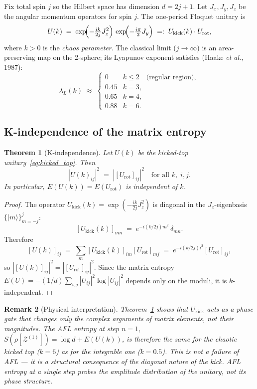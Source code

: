 \documentclass[12pt,a4paper]{article}
\newtheorem{theorem}{Theorem}[section]
\newtheorem{remark}[theorem]{Remark}
\begin{document}
Fix total spin $j$ so the Hilbert space has dimension $d = 2j+1$.
Let $J_x, J_y, J_z$ be the angular momentum operators for spin $j$.
The one-period Floquet unitary is
\begin{equation}\label{eq:kicked_top}
  U(k) \;=\; \exp\!\Bigl(-\tfrac{ik}{2j}J_z^2\Bigr)\,\exp\!\Bigl(-\tfrac{i\pi}{2}J_y\Bigr)
  \;=:\; U_{\mathrm{kick}}(k)\cdot U_{\mathrm{rot}},
\end{equation}
where $k>0$ is the \emph{chaos parameter}.  The classical limit ($j\to\infty$)
is an area-preserving map on the 2-sphere; its Lyapunov exponent satisfies
(Haake \emph{et al.}, 1987):
\begin{equation}\label{eq:lyapunov_table}
  \lambda_L(k) \;\approx\;
  \begin{cases}
    0    & k \leq 2 \quad\text{(regular region)},\\
    0.45 & k = 3,\\
    0.65 & k = 4,\\
    0.88 & k = 6.
  \end{cases}
\end{equation}

\subsection{K-independence of the matrix entropy}

\begin{theorem}[K-independence]\label{thm:k_independence}
Let $U(k)$ be the kicked-top unitary~\eqref{eq:kicked_top}.  Then
\[
  |U(k)_{ij}|^2 \;=\; |[U_{\mathrm{rot}}]_{ij}|^2
  \quad\text{for all } k,\; i,j.
\]
In particular, $E(U(k)) = E(U_{\mathrm{rot}})$ is \emph{independent of $k$}.
\end{theorem}

\begin{proof}
The operator $U_{\mathrm{kick}}(k) = \exp(-\tfrac{ik}{2j}J_z^2)$ is diagonal in the
$J_z$-eigenbasis $\{|m\rangle\}_{m=-j}^{j}$:
\[
  [U_{\mathrm{kick}}(k)]_{mn} \;=\; e^{-i(k/2j)m^2}\,\delta_{mn}.
\]
Therefore
\[
  [U(k)]_{ij}
  \;=\; \sum_m [U_{\mathrm{kick}}(k)]_{im}[U_{\mathrm{rot}}]_{mj}
  \;=\; e^{-i(k/2j)i^2}[U_{\mathrm{rot}}]_{ij},
\]
so $|[U(k)]_{ij}|^2 = |[U_{\mathrm{rot}}]_{ij}|^2$.  Since the matrix entropy
$E(U) = -(1/d)\sum_{i,j}|U_{ij}|^2\log|U_{ij}|^2$ depends only on the moduli,
it is $k$-independent.
\end{proof}

\begin{remark}[Physical interpretation]
Theorem~\ref{thm:k_independence} shows that $U_{\mathrm{kick}}$ acts as a
\emph{phase gate} that changes only the complex arguments of matrix elements,
not their magnitudes.  The AFL entropy at step $n=1$,
$S(\rho[\mathcal{Z}^{(1)}]) = \log d + E(U(k))$, is therefore the same for the
chaotic kicked top ($k=6$) as for the integrable one ($k=0.5$).
This is not a failure of AFL --- it is a structural consequence of the diagonal
nature of the kick.  AFL entropy at a single step probes the \emph{amplitude
distribution} of the unitary, not its phase structure.
\end{remark}
\end{document}
